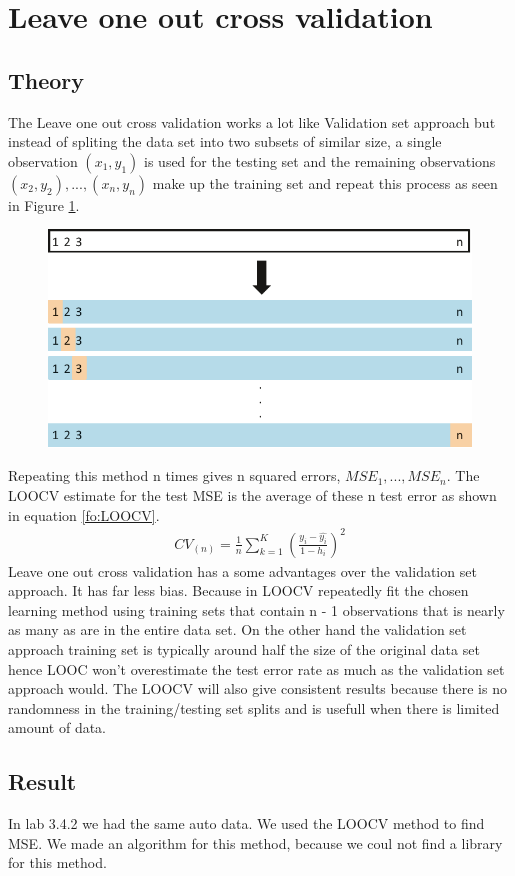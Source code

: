 \section {Leave one out cross validation}
\subsection{Theory}
The Leave one out cross validation works a lot like Validation set approach but instead of spliting the data set into two subsets of
similar size, a single observation $(x_1, y_1)$ is used for the testing set and the remaining observations ${(x_2, y_2), . . . , (x_n, y_n)}$ make up the training set and repeat this process as seen in Figure \ref{fig:loocv}.
\begin{figure}[H]
	\centering
	\includegraphics[width=0.5\linewidth]{crossValidation/LOOCV}
	\caption{}
	\label{fig:loocv}
\end{figure}
Repeating this method n times gives n squared errors, $MSE_1, . . . , MSE_n$. The LOOCV estimate for the test MSE is the average of these n test error as shown in equation \ref{fo:LOOCV}.
\begin{align}\label{fo:LOOCV}
CV_{(n)} = \frac {1}{n} \sum_{k=1}^{K}  (\frac {y_i-\hat{y_i}}{1- h_i})^2
\end{align}
Leave one out cross validation has a some advantages over the validation set approach. It has far less bias. Because in LOOCV repeatedly fit the chosen learning method using training sets that contain n - 1 observations that is nearly as many as are in the entire data set. On the other hand the validation set approach training set is typically around half the size of the original data set hence LOOC won't overestimate the test error rate as much as the validation set approach would. The LOOCV will also give consistent results because there is no randomness in the training/testing set splits and is usefull when there is limited amount of data.

\subsection{Result}
In lab 3.4.2 we had the same auto data. We used the LOOCV method to find MSE. We made an algorithm for this method, because we coul not find a library for this method.

